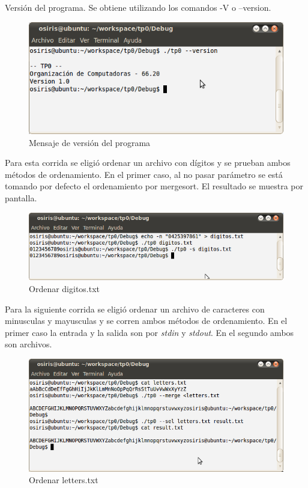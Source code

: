 \documentclass[a4paper,10pt]{article}
\begin{document}
Versión del programa. Se obtiene utilizando los comandos -V o --version.\\

\begin{figure}[!htp]
	\centering
	\includegraphics[width=9 cm]{tp0_opcion_version.png}
	\caption{Mensaje de versión del programa}
	\label{Figura2}
\end{figure}

Para esta corrida se eligió ordenar un archivo con dígitos y se prueban ambos métodos de ordenamiento. En el primer caso, al no pasar parámetro se está tomando por defecto el ordenamiento por mergesort. El resultado se muestra por pantalla.\\
\begin{figure}[!htp]
	\centering
	\includegraphics[width=10.5 cm]{tp0_corrida_exitosa_0.png}
	\caption{Ordenar digitos.txt}
	\label{Figura3}
\end{figure}

Para la siguiente corrida se eligió ordenar un archivo de caracteres con minusculas y mayusculas y se corren ambos métodos de ordenamiento. En el primer caso la entrada y la salida son por \textit{stdin} y \textit{stdout}. En el segundo ambos son archivos.\\
\begin{figure}[!htp]
	\centering
	\includegraphics[width=10.5 cm]{tp0_corrida_exitosa_1.png}
	\caption{Ordenar letters.txt}
	\label{Figura4}
\end{figure}
\end{document}
